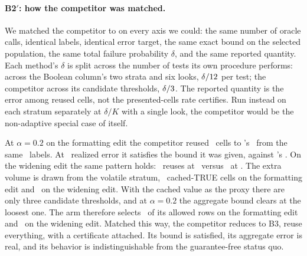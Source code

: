 \keeprunin
\paragraph{B2$'$: how the competitor was matched.} We matched the
competitor to \sivm{} on every axis we could: the same number of oracle
calls, identical labels, identical error target, the same exact bound
on the selected population, the same total failure probability
$\delta$, and the same reported quantity. Each method's $\delta$ is
split across the number of tests its own procedure performs: \sivm{}
across the Boolean column's two strata and six looks, $\delta/12$
per test; the competitor across its candidate thresholds,
$\delta/3$. The reported quantity is the error among reused
cells, not the presented-cells rate \sivm{} certifies. Run instead on
each stratum separately at $\delta/K$ with a single look, the
competitor would be the non-adaptive special case of \sivm{} itself.

At $\alpha{=}0.2$ on the formatting edit the competitor reused
\hhSupgReused\ cells to \sivm{}'s \hhSivmReused\ from the same
\hhBudget\ labels. At \hhSupgErr\ realized error it satisfies the
bound it was given, against \sivm{}'s \hhSivmErr. On the widening edit
the same pattern holds: \hhSupgReusedW\ reuses at \hhSupgErrW\ versus
\hhSivmReusedW\ at \hhSivmErrW. The extra volume is drawn from the
volatile stratum, \hhSupgTrueRows\ cached-TRUE cells on the formatting
edit and \hhSupgTrueRowsW\ on the widening edit. With the cached value
as the proxy there are only three candidate thresholds, and at
$\alpha{=}0.2$ the aggregate bound clears at the loosest one. The arm
therefore selects \hhSupgSelFrac\ of its allowed rows on the
formatting edit and \hhSupgSelFracW\ on the widening edit. Matched this
way, the competitor reduces to B3, reuse everything, with a certificate
attached. Its bound is satisfied, its aggregate error is real, and its
behavior is indistinguishable from the guarantee-free status quo.

\keeprunin
